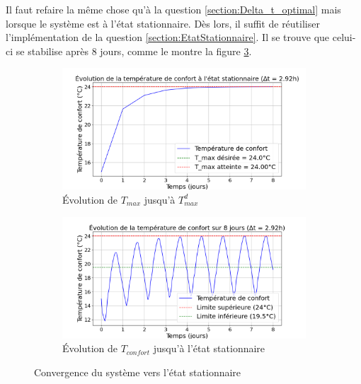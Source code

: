 \documentclass[12pt]{article}
\begin{document}
         Il faut refaire la même chose qu'à la question \ref{section:Delta_t_optimal} mais lorsque le système est à l'état stationnaire. Dès lors, il suffit de réutiliser l'implémentation de la question \ref{section:EtatStationnaire}. Il se trouve que celui-ci se stabilise après 8 jours, comme le montre la figure \ref{fig:T_confort_main}.
         \begin{figure}
            \centering
            \begin{subfigure}{0.50\textwidth}
                \centering
                \includegraphics[width=1\linewidth]{Rapport/figures/ConvergenceT_confort.png}
                \caption{Évolution de $T_{max}$ jusqu'à $T_{max}^d$} 
                \label{fig:T_confort_conv}
            \end{subfigure}
            \hfill
            \begin{subfigure}{0.48\textwidth}
                \centering
                \includegraphics[width=1\linewidth]{Rapport/figures/T_confort_8jours.png}
                \caption{Évolution de $T_{confort}$ jusqu'à l'état stationnaire} 
                \label{fig:8jours}
            \end{subfigure}
            \caption{Convergence du système vers l'état stationnaire}
            \label{fig:T_confort_main}
         \end{figure}
\end{document}
